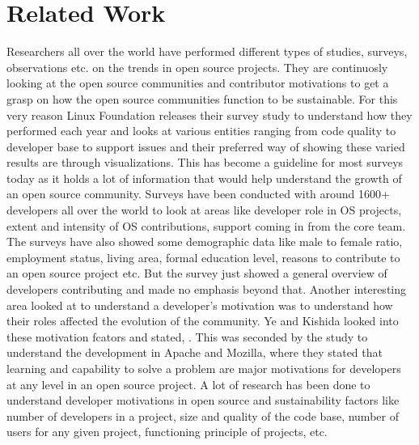 \documentclass[seploa]{beavtex}
\begin{document}
\chapter{Related Work}
Researchers all over the world have performed different types of studies, surveys, observations etc. on the trends in open source projects. They are continuosly looking at the open source communities and contributor motivations to get a grasp on how the open source communities function to be sustainable. For this very reason Linux Foundation releases their survey study to understand how they performed each year and looks at various entities ranging from code quality to developer base to support issues and their preferred way of showing these varied results are through visualizations\cite{lfs}. This has become a guideline for most surveys today as it holds a lot of information that would help understand the growth of an open source community. Surveys have been conducted with around 1600+ developers all over the world to look at areas like developer role in OS projects, extent and intensity of OS contributions, support coming in from the core team. The surveys have also showed some demographic data like male to female ratio, employment status, living area, formal education level, reasons to contribute to an open source project etc\cite{david2003}. But the survey just showed a general overview of developers contributing and made no emphasis beyond that. Another interesting area looked at to understand a developer's motivation was to understand how their roles affected the evolution of the community. Ye and Kishida looked into these motivation fcators and stated, \cite{kishida2003}. This was seconded by the study to understand the development in Apache and Mozilla, where they stated that learning and capability to solve a problem are major motivations for developers at any level in an open source project\cite{mockus2002}. A lot of research has been done to understand developer motivations in open source and sustainability factors like number of developers in a project\cite{david2003, rishab2002}, size and quality of the code base\cite{marc2014}, number of users for any given project\cite{rishab2002}, functioning principle of projects\cite{tarja2013}, etc.
\end{document}
